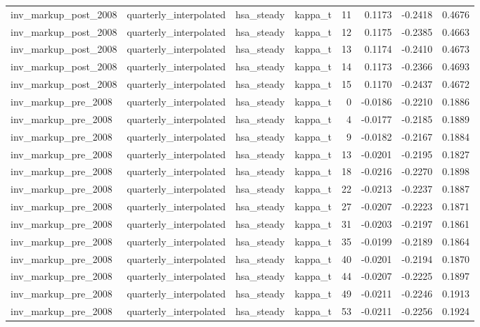 \begin{tabular}{llllrrrr}
inv\_markup\_post\_2008 & quarterly\_interpolated & hsa\_steady & kappa\_t & 11 & 0.1173 & -0.2418 & 0.4676 \\
inv\_markup\_post\_2008 & quarterly\_interpolated & hsa\_steady & kappa\_t & 12 & 0.1175 & -0.2385 & 0.4663 \\
inv\_markup\_post\_2008 & quarterly\_interpolated & hsa\_steady & kappa\_t & 13 & 0.1174 & -0.2410 & 0.4673 \\
inv\_markup\_post\_2008 & quarterly\_interpolated & hsa\_steady & kappa\_t & 14 & 0.1173 & -0.2366 & 0.4693 \\
inv\_markup\_post\_2008 & quarterly\_interpolated & hsa\_steady & kappa\_t & 15 & 0.1170 & -0.2437 & 0.4672 \\
inv\_markup\_pre\_2008 & quarterly\_interpolated & hsa\_steady & kappa\_t & 0 & -0.0186 & -0.2210 & 0.1886 \\
inv\_markup\_pre\_2008 & quarterly\_interpolated & hsa\_steady & kappa\_t & 4 & -0.0177 & -0.2185 & 0.1889 \\
inv\_markup\_pre\_2008 & quarterly\_interpolated & hsa\_steady & kappa\_t & 9 & -0.0182 & -0.2167 & 0.1884 \\
inv\_markup\_pre\_2008 & quarterly\_interpolated & hsa\_steady & kappa\_t & 13 & -0.0201 & -0.2195 & 0.1827 \\
inv\_markup\_pre\_2008 & quarterly\_interpolated & hsa\_steady & kappa\_t & 18 & -0.0216 & -0.2270 & 0.1898 \\
inv\_markup\_pre\_2008 & quarterly\_interpolated & hsa\_steady & kappa\_t & 22 & -0.0213 & -0.2237 & 0.1887 \\
inv\_markup\_pre\_2008 & quarterly\_interpolated & hsa\_steady & kappa\_t & 27 & -0.0207 & -0.2223 & 0.1871 \\
inv\_markup\_pre\_2008 & quarterly\_interpolated & hsa\_steady & kappa\_t & 31 & -0.0203 & -0.2197 & 0.1861 \\
inv\_markup\_pre\_2008 & quarterly\_interpolated & hsa\_steady & kappa\_t & 35 & -0.0199 & -0.2189 & 0.1864 \\
inv\_markup\_pre\_2008 & quarterly\_interpolated & hsa\_steady & kappa\_t & 40 & -0.0201 & -0.2194 & 0.1870 \\
inv\_markup\_pre\_2008 & quarterly\_interpolated & hsa\_steady & kappa\_t & 44 & -0.0207 & -0.2225 & 0.1897 \\
inv\_markup\_pre\_2008 & quarterly\_interpolated & hsa\_steady & kappa\_t & 49 & -0.0211 & -0.2246 & 0.1913 \\
inv\_markup\_pre\_2008 & quarterly\_interpolated & hsa\_steady & kappa\_t & 53 & -0.0211 & -0.2256 & 0.1924 \\

\end{tabular}
